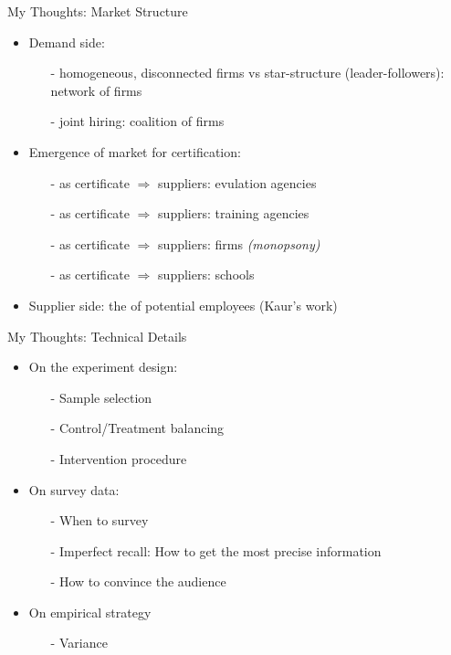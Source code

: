 \begin{frame}{My Thoughts: Market Structure}
    
    \begin{itemize}
        \item<1-> Demand side:
        \begin{itemize}
            \item[-] homogeneous, disconnected firms vs star-structure (leader-followers): network of firms 
            \item[-] joint hiring: coalition of firms
        \end{itemize}
         
        \item<2-> Emergence of market for certification:
        \begin{itemize}
            \item[-]  as certificate $\Rightarrow$ suppliers: evulation agencies
            \item[-]  as certificate $\Rightarrow$ suppliers: training agencies
            \item[-]  as certificate $\Rightarrow$ suppliers: firms \textit{(monopsony)}
            \item[-]  as certificate $\Rightarrow$ suppliers: schools
        \end{itemize}

        \item<3-> Supplier side: the  of potential employees (Kaur's work)
    \end{itemize}
\end{frame}

\begin{frame}{My Thoughts: Technical Details}
    \begin{itemize}
        \item<+-> On the experiment design: 
        \begin{itemize}
            \item[-] Sample selection
            \item[-] Control/Treatment balancing
            \item[-] Intervention procedure
        \end{itemize}
        \item<+-> On survey data:
        \begin{itemize}
            \item[-] When to survey
            \item[-] Imperfect recall: How to get the most precise information 
            \item[-] How to convince the audience
        \end{itemize}
        \item<+-> On empirical strategy
        \begin{itemize}
            \item[-] Variance
        \end{itemize}
    \end{itemize}
\end{frame}

